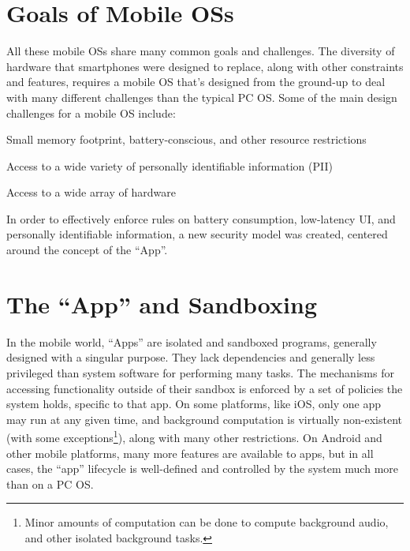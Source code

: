 \section{Goals of Mobile OSs}
All these mobile OSs share many common goals and challenges. The diversity of hardware that smartphones were designed to replace, along with other constraints and features, requires a mobile OS that's designed from the ground-up to deal with many different challenges than the typical PC OS. Some of the main design challenges for a mobile OS include: 
\begin{smitemize}

\item Small memory footprint, battery-conscious, and other resource restrictions

\item Access to a wide variety of personally identifiable information (PII)

\item Access to a wide array of hardware

\end{smitemize}
In order to effectively enforce rules on battery consumption, low-latency UI, and personally identifiable information, a new security model was created, centered around the concept of the ``App''. 



\section{The ``App'' and Sandboxing}

In the mobile world, ``Apps'' are isolated and sandboxed programs, generally designed with a singular purpose. They lack dependencies and generally less privileged than system software for performing many tasks. The mechanisms for accessing functionality outside of their sandbox is enforced by a set of policies the system holds, specific to that app. On some platforms, like iOS, only one app may run at any given time, and background computation is virtually non-existent (with some exceptions\footnote{Minor amounts of computation can be done to compute background audio, and other isolated background tasks.}), along with many other restrictions. On Android and other mobile platforms, many more features are available to apps, but in all cases, the ``app'' lifecycle is well-defined and controlled by the system much more than on a PC OS.

